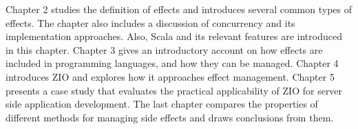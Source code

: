 Chapter 2 studies the definition of effects and introduces several common types of effects. The chapter also includes a discussion of concurrency and its implementation approaches. Also, Scala and its relevant features are introduced in this chapter. Chapter 3 gives an introductory account on how effects are included in programming languages, and how they can be managed. Chapter 4 introduces ZIO and explores how it approaches effect management. Chapter 5 presents a case study that evaluates the practical applicability of ZIO for server side application development. The last chapter compares the properties of different methods for managing side effects and draws conclusions from them.
